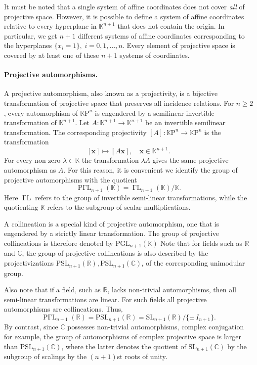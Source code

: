 \documentclass{article}
\newcommand{\reals}{\mathbb{R}}
\newcommand{\cnums}{\mathbb{C}}
\newcommand{\kf}{\mathbb{K}}
\newcommand{\KP}{{\mathbb{K}\mathrm{P}}}
\newcommand{\bx}{\mathbf{x}}
\newcommand{\PSL}{{\mathrm{PSL}}}
\newcommand{\SL}{{\mathrm{SL}}}
\newcommand{\PGL}{{\mathrm{PGL}}}
\newcommand{\GammaL}{\operatorname{\Gamma L}}
\newcommand{\PGammaL}{{\operatorname{P\Gamma L}}}
\begin{document}
It must be noted that a single system of affine coordinates does not
cover {\em all} of projective space.  However, it is possible to
define a system of affine coordinates relative to every hyperplane in
$\kf^{n+1}$ that does not contain the origin.  In particular, we get
$n+1$ different systems of affine coordinates corresponding to the
hyperplanes $\{ x_i = 1\},\; i=0,1,\ldots,n.$ Every element of
projective space is covered by at least one of these $n+1$ systems of
coordinates.

\paragraph{Projective automorphisms.}
A projective automorphism, also known as a projectivity, is a
bijective transformation of projective space that preserves all
incidence relations.  For $n\geq 2$, every automorphism of $\KP^n$ is
engendered by a semilinear invertible transformation of $\kf^{n+1}$.
Let $A:\kf^{n+1}\rightarrow\kf^{n+1}$ be an invertible semilinear
transformation.  The corresponding projectivity
$[A]:\KP^n\rightarrow\KP^n$ is the transformation $$[\bx] \mapsto
[A\bx],\quad \bx\in\kf^{n+1}.$$
For every non-zero $\lambda\in\kf$ the
transformation $\lambda A$ gives the same projective automorphism as
$A$.  For this reason, it is convenient we identify the group of
projective automorphisms with the quotient $$\PGammaL_{n+1}(\kf) =
\GammaL_{n+1}(\kf)/ \kf.$$
Here $\GammaL$ refers to the group of
invertible semi-linear transformations, while the quotienting $\kf$
refers to the subgroup of scalar multiplications.

A collineation is a special kind of projective automorphism, one that
is engendered by a strictly linear transformation.  The group of
projective collineations is therefore denoted by $\PGL_{n+1}(\kf)$
Note that for fields such as $\reals$ and $\cnums$, the group of
projective collineations is also described by the projectivizations
$\PSL_{n+1}(\reals), \PSL_{n+1}(\cnums)$, of the corresponding
unimodular group.

Also note that if a field, such as $\reals$, lacks non-trivial
automorphisms, then all semi-linear transformations are linear.  For
such fields all projective automorphisms are collineations.
Thus, 
$$\PGammaL_{n+1}(\reals)=\PSL_{n+1}(\reals)=\SL_{n+1}(\reals)/\{\pm\,
I_{n+1}\}.$$  By contrast, since $\cnums$
possesses non-trivial automorphisms, complex conjugation for example,
the group of automorphisms of complex projective space is larger than
$\PSL_{n+1}(\cnums)$, where the latter denotes the quotient of
$\SL_{n+1}(\cnums)$ by the subgroup of scalings by the $(n+1)$st roots
of unity.
\end{document}
